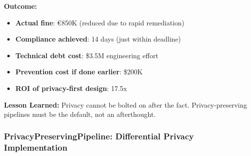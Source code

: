 \textbf{Outcome:}

\begin{itemize}
    \item \textbf{Actual fine}: €850K (reduced due to rapid remediation)
    \item \textbf{Compliance achieved}: 14 days (just within deadline)
    \item \textbf{Technical debt cost}: \$3.5M engineering effort
    \item \textbf{Prevention cost if done earlier}: \$200K
    \item \textbf{ROI of privacy-first design}: 17.5x
\end{itemize}

\textbf{Lesson Learned:} Privacy cannot be bolted on after the fact. Privacy-preserving pipelines must be the default, not an afterthought.

\subsubsection{PrivacyPreservingPipeline: Differential Privacy Implementation}

